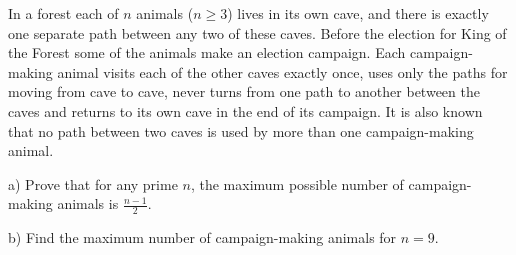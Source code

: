 In a forest each of $n$ animals ($n\ge 3$) lives in its own cave, and there is exactly one separate path between any two of these caves. Before the election for King of the Forest some of the animals make an election campaign. Each campaign-making animal visits each of the other caves exactly once, uses only the paths for moving from cave to cave, never turns from one path to another between the caves and returns to its own cave in the end of its campaign. It is also known that no path between two caves is used by more than one campaign-making animal.

a) Prove that for any prime $n$,  the maximum possible number of campaign-making animals is $\frac{n-1}{2}$.

b) Find the maximum number of campaign-making animals for $n=9$.